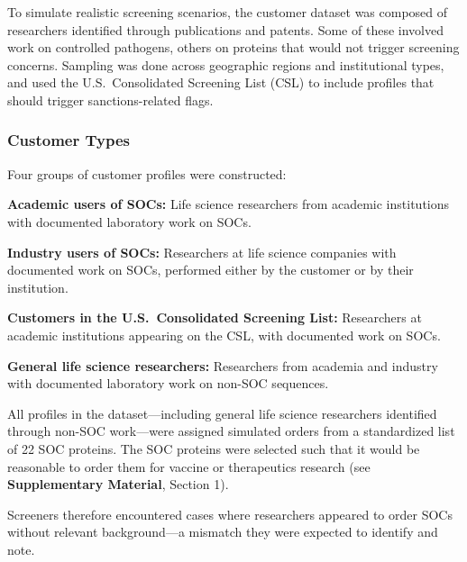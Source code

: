 \documentclass[12pt]{article}
\begin{document}
To simulate realistic screening scenarios, the customer dataset was composed of researchers identified through publications and patents. Some of these involved work on controlled pathogens, others on proteins that would not trigger screening concerns. Sampling was done across geographic regions and institutional types, and used the U.S.\ Consolidated Screening List (CSL) to include profiles that should trigger sanctions-related flags.

\subsubsection{Customer Types}

Four groups of customer profiles were constructed:

\textbf{Academic users of SOCs:} Life science researchers from academic institutions with documented laboratory work on SOCs.

\textbf{Industry users of SOCs:} Researchers at life science companies with documented work on SOCs, performed either by the customer or by their institution.

\textbf{Customers in the U.S.\ Consolidated Screening List:} Researchers at academic institutions appearing on the CSL, with documented work on SOCs.

\textbf{General life science researchers:} Researchers from academia and industry with documented laboratory work on non-SOC sequences.

All profiles in the dataset—including general life science researchers identified through non-SOC work—were assigned simulated orders from a standardized list of 22 SOC proteins. The SOC proteins were selected such that it would be reasonable to order them for vaccine or therapeutics research (see \textbf{Supplementary Material}, Section 1).

Screeners therefore encountered cases where researchers appeared to order SOCs without relevant background—a mismatch they were expected to identify and note.
\end{document}
